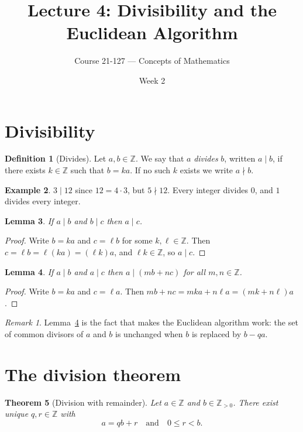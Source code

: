 \documentclass[11pt]{article}
\title{Lecture 4: Divisibility and the Euclidean Algorithm}
\author{Course 21-127 --- Concepts of Mathematics}
\date{Week 2}
\newtheorem{theorem}{Theorem}[section]
\newtheorem{lemma}[theorem]{Lemma}
\theoremstyle{definition}
\newtheorem{definition}[theorem]{Definition}
\newtheorem{example}[theorem]{Example}
\theoremstyle{remark}
\newtheorem*{remark}{Remark}
\newcommand{\Z}{\mathbb{Z}}
\begin{document}
\maketitle
\tableofcontents

\section{Divisibility}

\begin{definition}[Divides]
Let $a, b \in \Z$. We say that $a$ \emph{divides} $b$, written $a \mid b$,
if there exists $k \in \Z$ such that $b = ka$. If no such $k$ exists we
write $a \nmid b$.
\end{definition}

\begin{example}
$3 \mid 12$ since $12 = 4 \cdot 3$, but $5 \nmid 12$. Every integer divides
$0$, and $1$ divides every integer.
\end{example}

\begin{lemma}\label{lem:transitive}
If $a \mid b$ and $b \mid c$ then $a \mid c$.
\end{lemma}

\begin{proof}
Write $b = ka$ and $c = \ell b$ for some $k, \ell \in \Z$. Then
$c = \ell b = \ell(ka) = (\ell k) a$, and $\ell k \in \Z$, so $a \mid c$.
\end{proof}

\begin{lemma}\label{lem:linear}
If $a \mid b$ and $a \mid c$ then $a \mid (mb + nc)$ for all $m, n \in \Z$.
\end{lemma}

\begin{proof}
Write $b = ka$ and $c = \ell a$. Then $mb + nc = mka + n\ell a = (mk + n\ell)a$.
\end{proof}

\begin{remark}
Lemma~\ref{lem:linear} is the fact that makes the Euclidean algorithm
work: the set of common divisors of $a$ and $b$ is unchanged when $b$ is
replaced by $b - qa$.
\end{remark}

\section{The division theorem}

\begin{theorem}[Division with remainder]\label{thm:division}
Let $a \in \Z$ and $b \in \Z_{>0}$. There exist unique $q, r \in \Z$ with
\[
  a = qb + r \quad\text{and}\quad 0 \le r < b.
\]
\end{theorem}
\end{document}
